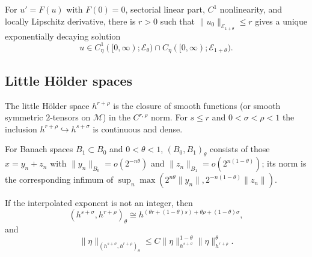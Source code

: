 \begin{proposition}
\label{prop:chow-iv-nonlinear-maximal-regularity}
For $u'=F(u)$ with $F(0)=0$, sectorial linear part, $C^1$ nonlinearity,
and locally Lipschitz derivative, there is $r>0$ such that
$\|u_0\|_{\mathcal E_{1+\theta}}\le r$ gives a unique exponentially decaying
solution
\[
 u\in C^1_\eta([0,\infty);\mathcal E_\theta)\cap
 C_\eta([0,\infty);\mathcal E_{1+\theta}).
\]
\end{proposition}

\subsection{Little H\"older spaces}

\begin{definition}
\label{def:chow-iv-little-holder-spaces}
The little H\"older space $h^{r+\rho}$ is the closure of smooth functions (or
smooth symmetric $2$-tensors on $\mathcal M$) in the $C^{r,\rho}$ norm.  For
$s\le r$ and $0<\sigma<\rho<1$ the inclusion
$h^{r+\rho}\hookrightarrow h^{s+\sigma}$ is continuous and dense.
\end{definition}

\begin{definition}
\label{def:chow-iv-continuous-interpolation}
For Banach spaces $B_1\subset B_0$ and $0<\theta<1$, $(B_0,B_1)_\theta$
consists of those $x=y_n+z_n$ with
$\|y_n\|_{B_0}=o(2^{-n\theta})$ and
$\|z_n\|_{B_1}=o(2^{n(1-\theta)})$; its norm is the corresponding infimum of
$\sup_n\max(2^{n\theta}\|y_n\|,2^{-n(1-\theta)}\|z_n\|)$.
\end{definition}

\begin{lemma}
\label{lem:chow-iv-holder-interpolation}
If the interpolated exponent is not an integer, then
\begin{equation*}
 (h^{s+\sigma},h^{r+\rho})_\theta\cong
 h^{(\theta r+(1-\theta)s)+\theta\rho+(1-\theta)\sigma},
 \tag{35.15}
\end{equation*}
and
\begin{equation*}
 \|\eta\|_{(h^{s+\sigma},h^{r+\rho})_\theta}
 \le C\|\eta\|_{h^{s+\sigma}}^{1-\theta}
 \|\eta\|_{h^{r+\rho}}^\theta.
 \tag{35.16}
\end{equation*}
\end{lemma}

